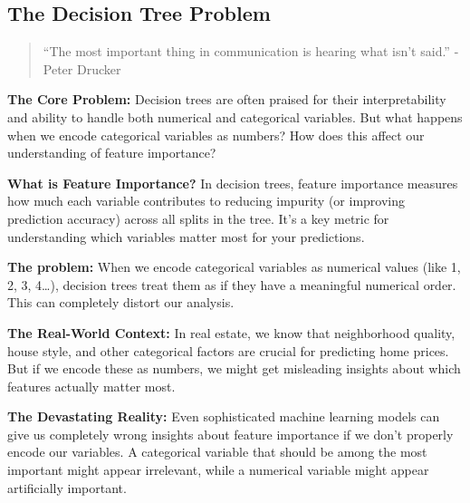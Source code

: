 \documentclass[
  letterpaper,
  DIV=11,
  numbers=noendperiod]{scrartcl}
\begin{document}
\subsection{The Decision Tree Problem
🎯}\label{the-decision-tree-problem}

\begin{quote}
``The most important thing in communication is hearing what isn't
said.'' - Peter Drucker
\end{quote}

\textbf{The Core Problem:} Decision trees are often praised for their
interpretability and ability to handle both numerical and categorical
variables. But what happens when we encode categorical variables as
numbers? How does this affect our understanding of feature importance?

\textbf{What is Feature Importance?} In decision trees, feature
importance measures how much each variable contributes to reducing
impurity (or improving prediction accuracy) across all splits in the
tree. It's a key metric for understanding which variables matter most
for your predictions.

\begin{tcolorbox}[enhanced jigsaw, bottomtitle=1mm, coltitle=black, rightrule=.15mm, colbacktitle=quarto-callout-important-color!10!white, opacityback=0, colback=white, toptitle=1mm, title=\textcolor{quarto-callout-important-color}{\faExclamation}\hspace{0.5em}{🎯 The Key Insight: Encoding Matters for Interpretability}, titlerule=0mm, left=2mm, arc=.35mm, colframe=quarto-callout-important-color-frame, leftrule=.75mm, bottomrule=.15mm, toprule=.15mm, opacitybacktitle=0.6, breakable]

\textbf{The problem:} When we encode categorical variables as numerical
values (like 1, 2, 3, 4\ldots), decision trees treat them as if they
have a meaningful numerical order. This can completely distort our
analysis.

\textbf{The Real-World Context:} In real estate, we know that
neighborhood quality, house style, and other categorical factors are
crucial for predicting home prices. But if we encode these as numbers,
we might get misleading insights about which features actually matter
most.

\textbf{The Devastating Reality:} Even sophisticated machine learning
models can give us completely wrong insights about feature importance if
we don't properly encode our variables. A categorical variable that
should be among the most important might appear irrelevant, while a
numerical variable might appear artificially important.

\end{tcolorbox}
\end{document}
